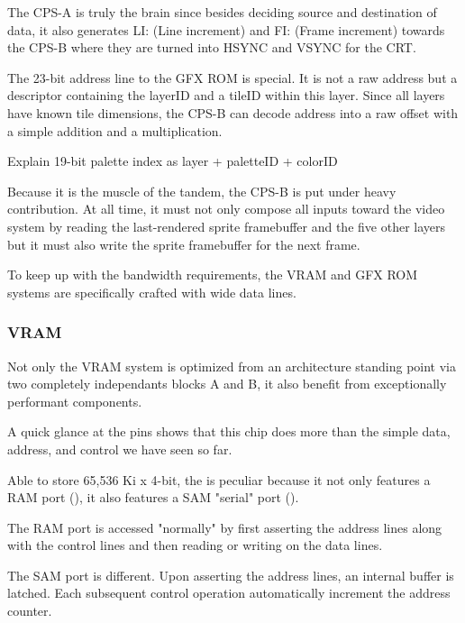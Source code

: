 The CPS-A is truly the brain since besides deciding source and destination of data, it also generates LI: (Line increment) and FI: (Frame increment) towards the CPS-B where they are turned into HSYNC and VSYNC for the CRT.

The 23-bit address line to the GFX ROM is special. It is not a raw address but a descriptor containing the layerID and a tileID within this layer. Since all layers have known tile dimensions, the CPS-B can decode address into a raw offset with a simple addition and a multiplication.

Explain 19-bit palette index as layer + paletteID + colorID


Because it is the muscle of the tandem, the CPS-B is put under heavy contribution. At all time, it must not only compose all inputs toward the video system by reading the last-rendered sprite framebuffer and the five other layers but it must also write the sprite framebuffer for the next frame.


To keep up with the bandwidth requirements, the VRAM and GFX ROM systems are specifically crafted with wide data lines.








\subsubsection{VRAM}
Not only the VRAM system is optimized from an architecture standing point via two completely independants blocks A and B, it also benefit from exceptionally performant components.

A quick glance at the  pins shows that this chip does more than the simple data, address, and control we have seen so far.


Able to store 65,536 Ki x 4-bit, the  is peculiar because it not only features a RAM port (), it also features a SAM "serial" port ().
 
The RAM port is accessed "normally" by first asserting the address lines along with the control lines and then reading or writing on the data lines.

The SAM port is different. Upon asserting the address lines, an internal buffer is latched. Each subsequent control operation automatically increment the address counter.

